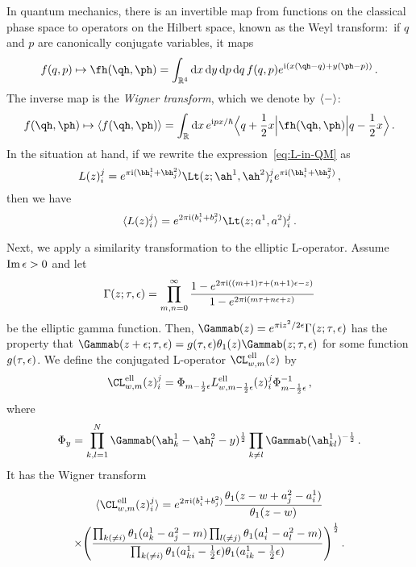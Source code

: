 In quantum mechanics, there is an invertible map from functions on the
classical phase space to operators on the Hilbert space, known as the
Weyl transform:~if $q$ and $p$ are canonically conjugate variables, it
maps
\begin{equation}
  f(q,p)
  \mapsto
  \fh(\qh,\ph)
  =
  \int_{\R^4}
  \rmd x \, \rmd y \, \rmd p \, \rmd q \,
  f(q,p)
  e^{\iu(x(\qh - q) + y(\ph - p))} \,.
\end{equation}
The inverse map is the \emph{Wigner transform}, which we denote by
$\langle - \rangle$:
\begin{equation}
  f(\qh,\ph)
  \mapsto
  \vev{f(\qh,\ph)}
  = \int_\R \rmd x \, e^{\iu px/\hbar}
  \Bigbra{q + \frac12 x} \fh(\qh,\ph) \Bigket{q - \frac12 x} \,.
\end{equation}
In the situation at hand, if we rewrite the
expression~\eqref{eq:L-in-QM} as
\begin{equation}
  L(z)_i^j
  =
  e^{\pi\iu(\bh_i^1 + \bh_j^2)}
  \Lt(z; \ah^1, \ah^2)_i^j
  e^{\pi\iu(\bh_i^1 + \bh_j^2)}
  \,,
\end{equation}
then we have
\begin{equation}
  \vev{L(z)_i^j}
  =
  e^{2\pi\iu(b_i^1 + b_j^2)} \Lt(z; a^1, a^2)_i^j \,.
\end{equation}

Next, we apply a similarity transformation to the elliptic L-operator.
Assume $\mathop{\mathrm{Im}}\nolimits\epsilon > 0$ and let
\begin{equation}
  \Gamma(z;\tau,\epsilon)
  =
  \prod_{m,n=0}^\infty
  \frac{1 - e^{2\pi\mathrm{i}((m+1)\tau + (n+1)\epsilon - z)}}
        {1 - e^{2\pi\mathrm{i}(m\tau + n\epsilon + z)}}
\end{equation}
be the elliptic gamma function.  Then,
$\Gammab(z) = e^{\pi\iu z^2/2\eps} \Gamma(z;\tau,\eps)$ has the
property that
$\Gammab(z + \eps; \tau,\eps) = g(\tau,\eps) \theta_1(z) \Gammab(z;\tau,\eps)$
for some function $g(\tau,\epsilon)$.  We define the
conjugated L-operator $\CL^{\text{ell}}_{w,m}(z)$ by
\begin{equation}
  \CL^{\text{ell}}_{w,m}(z)_i^j
  =
  \Phi_{m-\frac12\eps}
  L^{\text{ell}}_{w,m - \frac12\eps}(z)_i^j
  \Phi_{m-\frac12\eps}^{-1} \,,
\end{equation}
where
\begin{equation}
  \Phi_y
  =
  \prod_{k,l=1}^N \Gammab(\ah^1_k - \ah^2_l - y)^{\frac12}
  \prod_{k \neq l} \Gammab(\ah^1_{kl})^{-\frac12} \,.
\end{equation}
It has the Wigner transform
\begin{multline}
  \vev{\CL^{\text{ell}}_{w,m}(z)_i^j}
  =
  e^{2\pi\iu(b_i^1 + b_j^2)}
  \frac{\theta_1(z - w + a^2_j - a^1_i)}{\theta_1(z - w)}
  \\
  \times
  \Biggl(
  \frac{\prod_{k (\neq i)} \theta_1(a^1_k - a^2_j - m)
        \prod_{l (\neq j)} \theta_1(a^1_i - a^2_l - m)}
        {\prod_{k (\neq i)}\theta_1(a^1_{ki} - \frac12\eps)
        \theta_1(a^1_{ik} - \frac12\eps)}
  \Biggr)^{\frac12}
  \,.
\end{multline}

